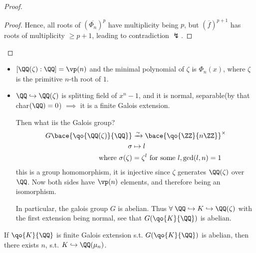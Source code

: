 \begin{proposition}
\begin{enumerate}
\begin{proof}
\begin{proof}
				      Hence, all roots of \( (\overline{\Phi_n})^p \) have multiplicity being \( p \), but
				      \( (\overline{f})^{p+1} \) has roots of multiplicity \( \geq p + 1 \), leading to
				      contradiction \( \lightning \).
			      \end{proof}
		      \end{proof}
	\end{enumerate}
\end{proposition}

\begin{conclusion}
	\leavevmode
	\begin{itemize}
		\item \( [\QQ(\zeta) : \QQ] = \vp(n) \) and the minimal polynomial of \( \zeta \) is \( \Phi_n(x) \), where
		      \( \zeta \) is the primitive \( n \)-th root of \( 1 \).
		\item \( \QQ \hookrightarrow \QQ(\zeta) \) is splitting field of \( x^n - 1 \), and it is
		      normal, separable(by that char\( (\QQ) = 0\)) \( \implies \) it is a finite Galois extension.

		      Then what iis the Galois group?
		      \[
			      \begin{aligned}
				      G \bace{\qo{\QQ(\zeta)}{\QQ}} & \xrightarrow{\sim} \bace{\qo{\ZZ}{n\ZZ}}^\times \\
				      \sigma                        & \mapsto l                                       \\
				      \text{where } \sigma(\zeta)   & = \zeta^l \text{ for some } l, \gcd(l,n) = 1
			      \end{aligned}
		      \]
		      this is a group homomorphism, it is injective since \( \zeta \) generates \( \QQ(\zeta) \)
		      over \( \QQ \). Now both sides have \( \vp(n) \) elements, and therefore being an isomorphism.

		      In particular, the galois group \( G \) is abelian. Thus \( \forall \; \QQ \hookrightarrow
		      K \hookrightarrow \QQ(\zeta)\) with the first extension being normal, see that \(
		      G(\qo{K}{\QQ}) \) is abelian.
	\end{itemize}
\end{conclusion}

\begin{theorem}
	If \( \qo{K}{\QQ} \) is finite Galois extension s.t. \( G(\qo{K}{\QQ}) \) is abelian, then there
	exists \( n \), s.t. \( K \hookrightarrow \QQ(\mu_n) \).
\end{theorem}

